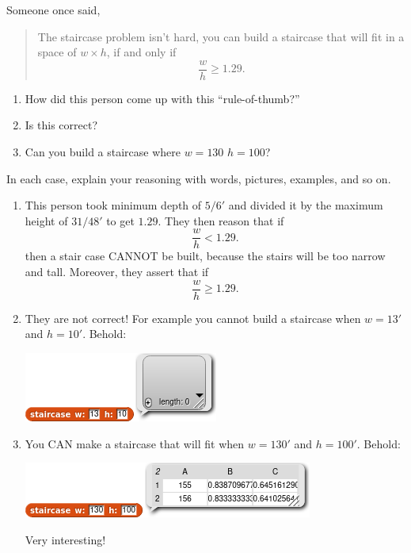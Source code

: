 \documentclass[noauthor,nooutcomes,12pt,handout]{ximera}
\begin{document}
\begin{question}
  Someone once said,
  \begin{quote}
    The staircase problem isn't hard, you can build a staircase that
    will fit in a space of $w\times h$, if and only if
    \[
    \frac{w}{h} \ge 1.29.
    \]
  \end{quote}
  \begin{enumerate}
    \item How did this person come up with this ``rule-of-thumb?''
    \item Is this correct?
    \item Can you build a staircase where $w=130$ $h=100$? 
  \end{enumerate}
  In each case, explain your reasoning with words, pictures, examples, and so on.
  \begin{freeResponse}
    \begin{enumerate}
    \item This person took minimum depth of $5/6'$ and divided it by
      the maximum height of $31/48'$ to get $1.29$. They then reason that if
      \[
      \frac{w}{h} <1.29.
      \]
      then a stair case CANNOT be built, because the stairs will be
      too narrow and tall. Moreover, they assert that if
      \[
      \frac{w}{h} \ge 1.29.
      \]
    \item They are not correct! For example you cannot build a
      staircase when $w=13'$ and $h=10'$. Behold:
      \begin{center}
        \includegraphics{answer-13-10-result.png}
      \end{center}

    \item You CAN make a staircase that will fit when $w=130'$ and
      $h=100'$. Behold:
      \begin{center}
        \includegraphics{answer-130-100-result.png}
      \end{center}
      Very interesting!
    \end{enumerate}
  \end{freeResponse}
\end{question}
\end{document}
